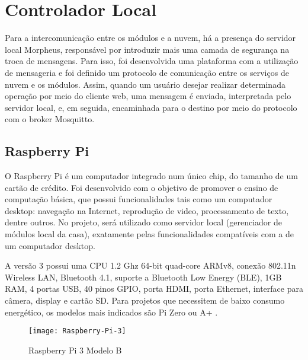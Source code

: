 \section{Controlador Local}
Para a intercomunicação entre os módulos e a nuvem, há a presença do servidor local Morpheus, responsável por introduzir mais uma camada de segurança na troca de mensagens. Para isso, foi desenvolvida uma plataforma com a utilização de mensageria e foi definido um protocolo de comunicação entre os serviços de nuvem e os módulos. Assim, quando um usuário desejar realizar determinada operação por meio do cliente web, uma mensagem é enviada, interpretada pelo servidor local, e, em seguida, encaminhada para o destino por meio do protocolo \wmqtt{} com o broker Mosquitto.

\subsection{Raspberry Pi}
O Raspberry Pi é um computador integrado num único chip, do tamanho de um cartão de crédito. Foi desenvolvido com o objetivo de promover o ensino de computação básica, que possui funcionalidades tais como um computador desktop: navegação na Internet, reprodução de video, processamento de texto, dentre outros. No projeto, será utilizado como servidor local (gerenciador de módulos local da casa), exatamente pelas funcionalidades compatíveis com a de um computador desktop.

A versão 3 possui uma CPU 1.2 Ghz 64-bit quad-core ARMv8, conexão 802.11n Wireless LAN, Bluetooth 4.1, suporte a Bluetooth Low Energy (BLE), 1GB RAM, 4 portas USB, 40 pinos GPIO, porta HDMI, porta Ethernet, interface para câmera, display e cartão SD. Para projetos que necessitem de baixo consumo energético, os modelos mais indicados são Pi Zero ou A+ \cite{raspPi}.

\begin{figure}[H]
	\centering
	\caption{Raspberry Pi 3 Modelo B}
  \texttt{[image: Raspberry-Pi-3]}
\label{fig:Raspberry-Pi-3}
\end{figure}
